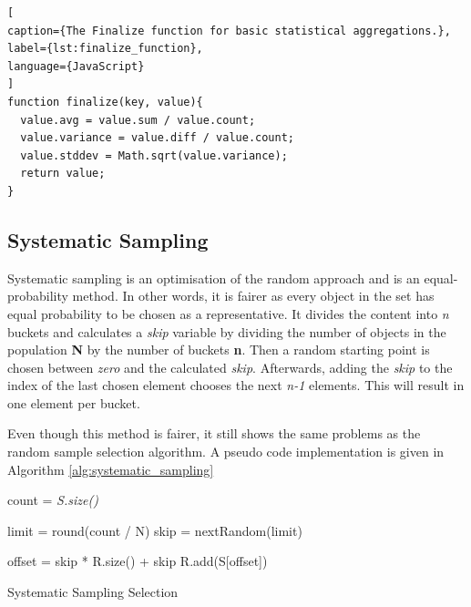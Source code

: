 \begin{lstlisting}[
caption={The Finalize function for basic statistical aggregations.},
label={lst:finalize_function},
language={JavaScript}
]
function finalize(key, value){
  value.avg = value.sum / value.count;
  value.variance = value.diff / value.count;
  value.stddev = Math.sqrt(value.variance);
  return value;
}
\end{lstlisting}

\subsection{Systematic Sampling}
Systematic sampling is an optimisation of the random approach and is an equal-probability method. In other words, it is fairer as every object in the set has equal probability to be chosen as a representative. It divides the content into \textit{n} buckets and calculates a \textit{skip} variable by dividing the number of objects in the population \textbf{N} by the number of buckets \textbf{n}. Then a random starting point is chosen between \textit{zero} and the calculated \textit{skip}. Afterwards, adding the \textit{skip} to the index of the last chosen element chooses the next \textit{n-1} elements.  This will result in one element per bucket.

Even though this method is fairer, it still shows the same problems as the random sample selection algorithm. A pseudo code implementation is given in Algorithm \ref{alg:systematic_sampling}

\begin{algorithm}[!htb]
\SetAlgoLined
{}

 \BlankLine

 count = \textit{S.size()}\; 
 
 limit = round(count / N)\;
  skip = nextRandom(limit)\;
  
   {
     offset = skip * R.size() + skip\;
     R.add(S[offset])\;
  }
 \caption{Systematic Sampling Selection}
 \label{alg:systematic_sampling}
\end{algorithm}

\pagebreak
